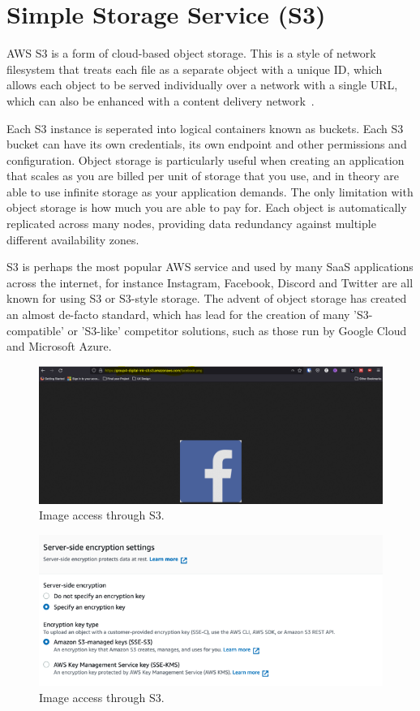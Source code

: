 \chapter{Simple Storage Service (S3)}\label{ch:simple-storage-service}

AWS S3 is a form of cloud-based object storage.
This is a style of network filesystem that treats each file as a separate object with a unique ID, which allows each
object to be served individually over a network with a single URL, which can also be enhanced with a content delivery
network~\parencite{amazon2022cloud}.

Each S3 instance is seperated into logical containers known as buckets.
Each S3 bucket can have its own credentials, its own endpoint and other permissions and configuration.
Object storage is particularly useful when creating an application that scales as you are billed per unit of storage
that you use, and in theory are able to use infinite storage as your application demands.
The only limitation with object storage is how much you are able to pay for.
Each object is automatically replicated across many nodes, providing data redundancy against multiple different
availability zones.

S3 is perhaps the most popular AWS service and used by many SaaS applications across the internet, for instance
Instagram, Facebook, Discord and Twitter are all known for using S3 or S3-style storage.
The advent of object storage has created an almost de-facto standard, which has lead for the creation of many
'S3-compatible' or 'S3-like' competitor solutions, such as those run by Google Cloud and Microsoft Azure.

\begin{figure}
    \centering
    \includegraphics[width=\textwidth]{resources/s3/s3-image-displayed}
    \caption{Image access through S3.}
    \label{fig:s3-image}
\end{figure}

\begin{figure}
    \centering
    \includegraphics[width=\textwidth]{resources/s3/s3_encryption.PNG}
    \caption{Image access through S3.}
    \label{fig:s3-image-2}
\end{figure}
